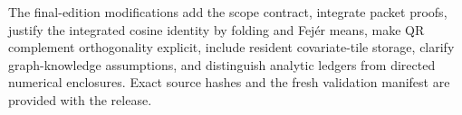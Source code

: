 \documentclass[11pt]{article}
\theoremstyle{definition}
\theoremstyle{remark}
\begin{document}
The final-edition modifications add the scope contract, integrate packet
proofs, justify the integrated cosine identity by folding and Fej\'er means,
make QR complement orthogonality explicit, include resident covariate-tile
storage, clarify graph-knowledge assumptions, and distinguish analytic
ledgers from directed numerical enclosures.  Exact source hashes and the
fresh validation manifest are provided with the release.
\end{document}
